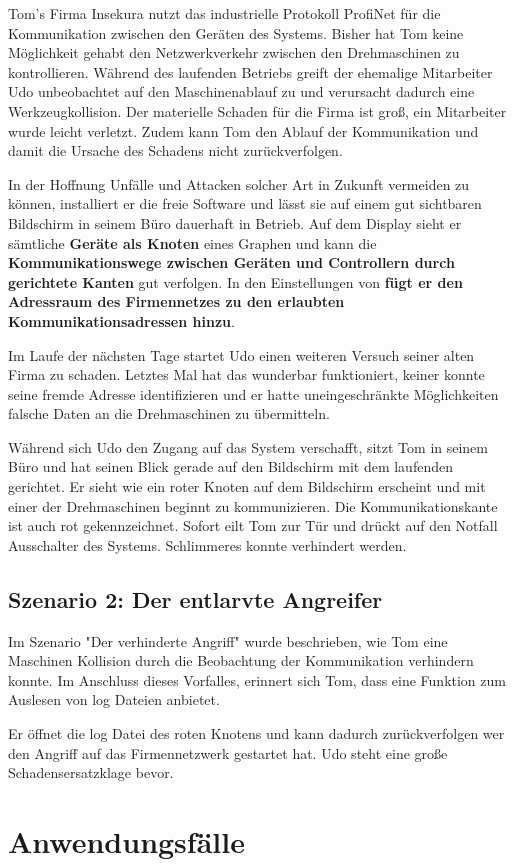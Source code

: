 Tom's Firma Insekura nutzt das industrielle Protokoll ProfiNet für die Kommunikation zwischen den Geräten des Systems. Bisher hat Tom keine Möglichkeit gehabt den Netzwerkverkehr zwischen den Drehmaschinen zu kontrollieren. Während des laufenden Betriebs greift der ehemalige Mitarbeiter Udo unbeobachtet auf den Maschinenablauf zu und verursacht dadurch eine Werkzeugkollision. Der materielle Schaden für die Firma ist groß, ein Mitarbeiter wurde leicht verletzt. Zudem kann Tom den Ablauf der Kommunikation und damit die Ursache des Schadens nicht zurückverfolgen.

In der Hoffnung Unfälle und Attacken solcher Art in Zukunft vermeiden zu können, installiert er die freie Software \programname und lässt sie auf einem gut sichtbaren Bildschirm in seinem Büro dauerhaft in Betrieb. Auf dem Display sieht er sämtliche \textbf{Geräte als Knoten} eines Graphen und kann die \textbf{Kommunikationswege zwischen Geräten und Controllern durch gerichtete Kanten} gut verfolgen. In den Einstellungen von \programname \textbf{fügt er den Adressraum des Firmennetzes zu den erlaubten Kommunikationsadressen hinzu}.

Im Laufe der nächsten Tage startet Udo einen weiteren Versuch seiner alten Firma zu schaden. Letztes Mal hat das wunderbar funktioniert, keiner konnte seine fremde Adresse identifizieren und er hatte uneingeschränkte Möglichkeiten falsche Daten an die Drehmaschinen zu übermitteln.

Während sich Udo den Zugang auf das System verschafft, sitzt Tom in seinem Büro und hat seinen Blick gerade auf den Bildschirm mit dem laufenden \programname gerichtet. Er sieht wie ein roter Knoten auf dem Bildschirm erscheint und mit einer der Drehmaschinen beginnt zu kommunizieren. Die Kommunikationskante ist auch rot gekennzeichnet. Sofort eilt Tom zur Tür und drückt auf den Notfall Ausschalter des Systems. Schlimmeres konnte verhindert werden.


\subsection{Szenario 2: Der entlarvte Angreifer}

Im Szenario "Der verhinderte Angriff" wurde beschrieben, wie Tom eine Maschinen Kollision durch die Beobachtung der Kommunikation verhindern konnte. Im Anschluss dieses Vorfalles, erinnert sich Tom, dass \programname eine Funktion zum Auslesen von log Dateien anbietet.

Er öffnet die log Datei des roten Knotens und kann dadurch zurückverfolgen wer den Angriff auf das Firmennetzwerk gestartet hat. Udo steht eine große Schadensersatzklage bevor.
 

\section{Anwendungsfälle} 